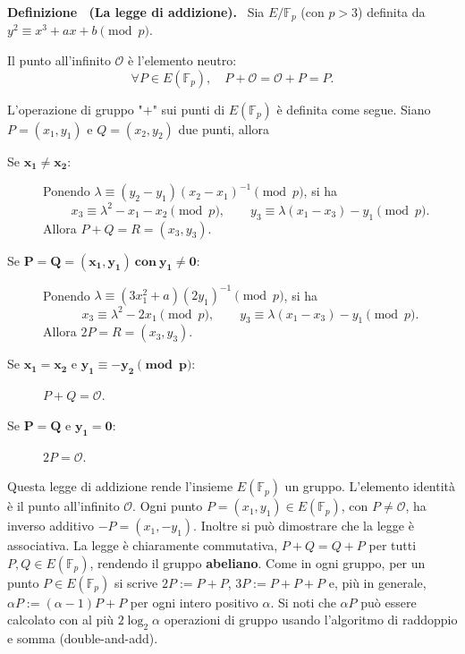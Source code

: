 \documentclass[a4paper, 11pt]{article}
\newenvironment{definition}[1][]{
  \par\noindent\textbf{Definizione%
  \if\relax\detokenize{#1}\relax\else\ (\textbf{#1})\fi.}\ }{}
\begin{document}
\begin{definition}[La legge di addizione]
Sia $E/\mathbb{F}_p$ (con $p>3$) definita da $y^2 \equiv x^3+ax+b \pmod{p}$.

Il punto all'infinito $\mathcal{O}$ è l'elemento neutro:
\[
    \forall P\in E(\mathbb{F}_p),\quad P+\mathcal{O}=\mathcal{O}+P=P.
\]

L'operazione di gruppo "$+$" sui punti di $E(\mathbb{F}_p)$ è definita come segue. Siano $P = (x_1, y_1)$ e $Q = (x_2, y_2)$ due punti, allora

\begin{description}
    \item[Se $\mathbf{x_1 \neq x_2}$:] Ponendo $\lambda \equiv (y_2-y_1)(x_2-x_1)^{-1} \pmod p$, si ha
    \[
        x_3 \equiv \lambda^2 - x_1 - x_2 \pmod p, 
        \qquad 
        y_3 \equiv \lambda(x_1 - x_3) - y_1 \pmod p.
    \]
    Allora $P + Q = R = (x_3, y_3)$.
    \item[Se $\mathbf{P=Q=(x_1,y_1)\ \text{con}\ y_1\neq 0}$:] Ponendo $\lambda \equiv (3x_1^2 + a)(2y_1)^{-1} \pmod p$, si ha
    \[
        x_3 \equiv \lambda^2 - 2x_1 \pmod p, 
        \qquad 
        y_3 \equiv \lambda(x_1 - x_3) - y_1 \pmod p.
    \]
    Allora $2P = R = (x_3, y_3)$.
    \item[Se $\mathbf{x_1=x_2}$ e $\mathbf{y_1 \equiv -y_2 \pmod p}$:] $P+Q=\mathcal{O}$.
    \item[Se $\mathbf{P=Q}$ e $\mathbf{y_1=0}$:] $2P=\mathcal{O}$.
\end{description}
\end{definition}
Questa legge di addizione rende l'insieme $E(\mathbb{F}_p)$ un gruppo. L'elemento identità è il punto all'infinito $\mathcal{O}$. Ogni punto $P=(x_1,y_1)\in E(\mathbb{F}_p)$, con $P\neq\mathcal{O}$, ha inverso additivo $-P=(x_1,-y_1)$. Inoltre si può dimostrare che la legge è associativa. La legge è chiaramente commutativa, $P+Q=Q+P$ per tutti $P,Q\in E(\mathbb{F}_p)$, rendendo il gruppo \textbf{abeliano}.
Come in ogni gruppo, per un punto $P\in E(\mathbb{F}_p)$ si scrive $2P:=P+P$, $3P:=P+P+P$ e, più in generale, $\alpha P := (\alpha-1)P + P$ per ogni intero positivo $\alpha$. Si noti che $\alpha P$ può essere calcolato con al più $2\log_2\alpha$ operazioni di gruppo usando l'algoritmo di raddoppio e somma (double-and-add).
\end{document}

